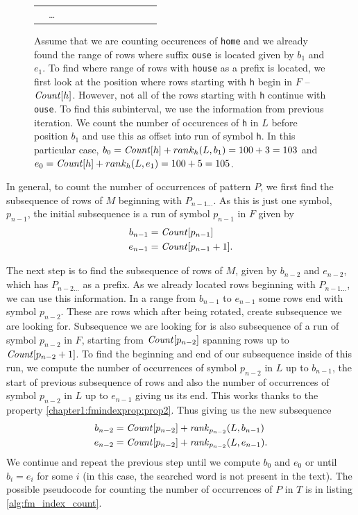 \begin{figure}
{\begin{tabular}{c|c|l|l|l|l|l|l|l|l|l|l|}
	                & \ldots     &   &  &   &   &   &   &   &   &   &   \\ \cline{5-10}\cline{2-3}\cline{12-12}
	\end{tabular}
	}
	\caption[TODO]{Assume that we are counting occurences of \texttt{home} and we already found the
	range of rows where suffix \texttt{ouse} is located given by $b_1$ and $e_1$. To find where range
	of rows with \texttt{house} as a prefix is located, we first look at the position where rows starting with
	\texttt{h} begin in $F$ -- $\mathit{Count}[h]$. However, not all of the rows starting with \texttt{h} continue with
	\texttt{ouse}. To find this subinterval, we use the information from previous iteration. We count
	the number of occurences of \texttt{h} in $L$ before position $b_1$ and use this as offset into run of
	symbol \texttt{h}. In this particular case, $b_0 = \mathit{Count}[h] + rank_h(L, b_1) = 100 + 3 = 103$ and
	$e_0 = \mathit{Count}[h] + rank_h(L, e_1) = 100 + 5 = 105$.
	}
	\label{tab:fm_index_example}
\end{figure}

In general, to count the number of occurrences of pattern $P$, we first find the subsequence of rows of $M$
beginning with $P_{n-1\ldots}$. As this is just one symbol, $p_{n-1}$, the initial subsequence is a run
of symbol $p_{n-1}$ in $F$ given by
\begin{align*}
	b_{n-1}&=\mathit{Count}[p_{n-1}] \\
	e_{n-1}&=\mathit{Count}[p_{n-1}+1].\\
\end{align*}

The next step is to find the subsequence of rows of $M$, given by $b_{n-2}$ and $e_{n-2}$, which has
$P_{n-2\ldots}$ as a prefix. As we already located rows beginning with $P_{n-1\ldots}$, we can use
this information. In a range from $b_{n-1}$ to $e_{n-1}$ some rows end with symbol $p_{n-2}$. These
are rows which after being rotated, create subsequence we are looking for. Subsequence we are looking
for is also subsequence of a run of symbol $p_{n-2}$ in $F$, starting from $\mathit{Count}[p_{n-2}]$ spanning
rows up to $\mathit{Count}[p_{n-2}+1]$. To find the beginning and end of our subsequence inside of this run, we
compute the number of occurrences of symbol $p_{n-2}$ in $L$ up to $b_{n-1}$, the start of previous
subsequence of rows and also the number of occurrences of symbol $p_{n-2}$ in $L$ up to $e_{n-1}$
giving us its end. This works thanks to the property \ref{chapter1:fmindexprop:prop2}. Thus giving us the
new subsequence
\begin{align*}
	b_{n-2}&=\mathit{Count}[p_{n-2}] + \mathit{rank}_{p_{n-2}}(L, b_{n-1}) \\
	e_{n-2}&=\mathit{Count}[p_{n-2}] + \mathit{rank}_{p_{n-2}}(L, e_{n-1}).\\
\end{align*}
We continue and repeat the previous step until we compute $b_0$ and $e_0$ or until $b_i=e_i$ for some $i$
(in this case, the searched word is not present in the text). The possible pseudocode for counting the number
of occurrences of $P$ in $T$ is in listing \ref{alg:fm_index_count}.

